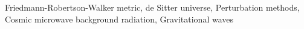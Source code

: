 \documentclass[twocolumn]{aastex631}
\begin{document}
Friedmann-Robertson-Walker metric, de Sitter universe, Perturbation methods, Cosmic microwave background radiation, Gravitational waves
\end{document}
